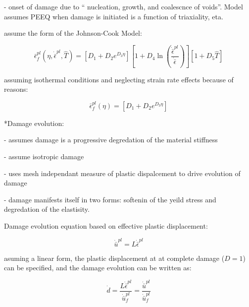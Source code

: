 - onset of damage due to `` nucleation, growth, and coalescnce of
voids''. Model assumes PEEQ when damage is initiated is a function
of triaxiality, eta.

assume the form of the Johnson-Cook Model:

\begin{equation}
\bar{\epsilon}_{f}^{pl}\left(\eta,\dot{\bar{\epsilon}}^{pl},\hat{T}\right)=\left[D_{1}+D_{2}e^{D_{3}\eta}\right]\left[1+D_{4}\ln\left(\frac{\dot{\bar{\epsilon}}^{pl}}{\dot{\bar{\epsilon}}}\right)\right]\left[1+D_{5}\hat{T}\right]\label{eqn:druc7}
\end{equation}


assuming isothermal conditions and neglecting strain rate effects
because of reasons:

\begin{equation}
\bar{\epsilon}_{f}^{pl}\left(\eta\right)=\left[D_{1}+D_{2}e^{D_{3}\eta}\right]\label{eqn:druc8}
\end{equation}


{*}Damage evolution:

- assumes damage is a progressive degredation of the material stiffness

- assume isotropic damage

- uses mesh independant measure of plastic dispalcement to drive evolution
of damage

- damage manifests itself in two forms: softenin of the yeild stress
and degredation of the elastisity.

Damage evolution equation based on effective plastic displacement:

\begin{equation}
\dot{\bar{u}}^{pl}=L\dot{\bar{\epsilon}}^{pl}\label{eqn:druc9}
\end{equation}


asuming a linear form, the plastic displacement at at complete damage
($D=1$) can be specified, and the damage evolution can be written
as:

\begin{equation}
\dot{d}=\frac{L\dot{\bar{\epsilon}}^{pl}}{\dot{\bar{u}}_{f}^{pl}}=\frac{\dot{\bar{u}}^{pl}}{\dot{\bar{u}}_{f}^{pl}}\label{eqn:druc9-1}
\end{equation}

